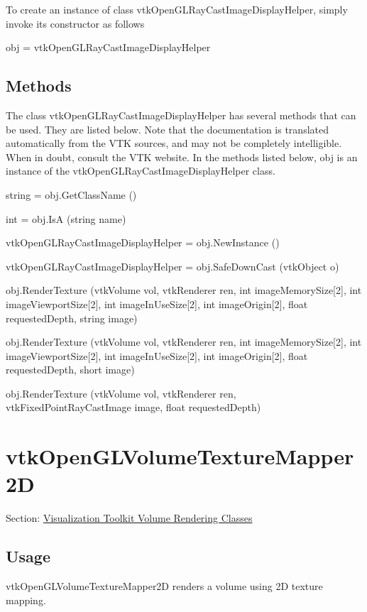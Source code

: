 To create an instance of class vtk\-Open\-G\-L\-Ray\-Cast\-Image\-Display\-Helper, simply invoke its constructor as follows \begin{DoxyVerb}  obj = vtkOpenGLRayCastImageDisplayHelper
\end{DoxyVerb}
 \hypertarget{vtkwidgets_vtkxyplotwidget_Methods}{}\subsection{Methods}\label{vtkwidgets_vtkxyplotwidget_Methods}
The class vtk\-Open\-G\-L\-Ray\-Cast\-Image\-Display\-Helper has several methods that can be used. They are listed below. Note that the documentation is translated automatically from the V\-T\-K sources, and may not be completely intelligible. When in doubt, consult the V\-T\-K website. In the methods listed below, {\ttfamily obj} is an instance of the vtk\-Open\-G\-L\-Ray\-Cast\-Image\-Display\-Helper class. 
\begin{DoxyItemize}
\item {\ttfamily string = obj.\-Get\-Class\-Name ()}  
\item {\ttfamily int = obj.\-Is\-A (string name)}  
\item {\ttfamily vtk\-Open\-G\-L\-Ray\-Cast\-Image\-Display\-Helper = obj.\-New\-Instance ()}  
\item {\ttfamily vtk\-Open\-G\-L\-Ray\-Cast\-Image\-Display\-Helper = obj.\-Safe\-Down\-Cast (vtk\-Object o)}  
\item {\ttfamily obj.\-Render\-Texture (vtk\-Volume vol, vtk\-Renderer ren, int image\-Memory\-Size\mbox{[}2\mbox{]}, int image\-Viewport\-Size\mbox{[}2\mbox{]}, int image\-In\-Use\-Size\mbox{[}2\mbox{]}, int image\-Origin\mbox{[}2\mbox{]}, float requested\-Depth, string image)}  
\item {\ttfamily obj.\-Render\-Texture (vtk\-Volume vol, vtk\-Renderer ren, int image\-Memory\-Size\mbox{[}2\mbox{]}, int image\-Viewport\-Size\mbox{[}2\mbox{]}, int image\-In\-Use\-Size\mbox{[}2\mbox{]}, int image\-Origin\mbox{[}2\mbox{]}, float requested\-Depth, short image)}  
\item {\ttfamily obj.\-Render\-Texture (vtk\-Volume vol, vtk\-Renderer ren, vtk\-Fixed\-Point\-Ray\-Cast\-Image image, float requested\-Depth)}  
\end{DoxyItemize}\hypertarget{vtkvolumerendering_vtkopenglvolumetexturemapper2d}{}\section{vtk\-Open\-G\-L\-Volume\-Texture\-Mapper2\-D}\label{vtkvolumerendering_vtkopenglvolumetexturemapper2d}
Section\-: \hyperlink{sec_vtkvolumerendering}{Visualization Toolkit Volume Rendering Classes} \hypertarget{vtkwidgets_vtkxyplotwidget_Usage}{}\subsection{Usage}\label{vtkwidgets_vtkxyplotwidget_Usage}
vtk\-Open\-G\-L\-Volume\-Texture\-Mapper2\-D renders a volume using 2\-D texture mapping.


